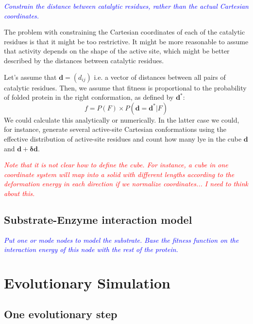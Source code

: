 \documentclass[12pt]{article}
\newcommand{\todo}[1]{\emph{\textcolor{blue} {#1}}}
\newcommand{\comment}[1]{\emph{\textcolor{red} {#1}}}
\newcommand{\dij}{d_{ij}}
\begin{document}
\todo{Constrain the distance between catalytic residues, rather than the actual Cartesian coordinates.}

The problem with constraining the Cartesian coordinates of each of the catalytic residues is that it might be too restrictive. It might be more reasonable to assume that activity depends on the shape of the active site, which might be better described by the distances between catalytic residues. 

Let's assume that $\mathbf{d} = (\dij)$ i.e. a vector of distances between all pairs of catalytic residues. Then, we assume that fitness is proportional to the probability of folded protein in the right conformation, as defined by $\mathbf{d}^*$:
\begin{equation}
f = P(F) \times P(\mathbf{d} = \mathbf{d}^*|F)
\end{equation}
We could calculate this analytically or numerically. In the latter case we could, for instance, generate several active-site Cartesian conformations using the effective distribution of active-site residues and count how many lye in the cube $\mathbf{d}$ and $\mathbf{d}+\mathbf{\delta d}$.

\comment{Note that it is not clear how to define the cube. For instance, a cube in one coordinate system will map into a solid with different lengths according to the deformation energy in each direction if we normalize coordinates... I need to think about this.}

\subsection{Substrate-Enzyme interaction model}

\todo{Put one or mode nodes to model the substrate. Base the fitness function on the interaction energy of this node with the rest of the protein.}


\section{Evolutionary Simulation}


\subsection{One evolutionary step}
\end{document}
